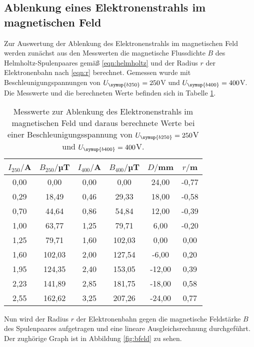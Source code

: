 \subsection{Ablenkung eines Elektronenstrahls im magnetischen Feld}
\label{subsec:bfeld}

Zur Auswertung der Ablenkung des Elektronenstrahls im magnetischen Feld werden
zunächst aus den Messwerten die magnetische Flussdichte $B$ des Helmholtz-Spulenpaares
gemäß \eqref{eqn:helmholtz} und der Radius $r$ der Elektronenbahn nach \eqref{eqn:r} berechnet.
Gemessen wurde mit Beschleunigungspannungen von $U_{\symup{b250}}=250$V und
$U_{\symup{b400}}=400$V. Die Messwerte und
die berechneten Werte befinden sich in Tabelle \ref{tab:magnetisch}.

\begin{table}[htp]
	\begin{center}
    \caption{Messwerte zur Ablenkung des Elektronenstrahls im magnetischen Feld und
    daraus berechnete Werte bei einer Beschleunigungsspannung von
    $U_{\symup{b250}}=250$V und $U_{\symup{b400}}=400$V.}
    \label{tab:magnetisch}
		\begin{tabular}{cccccc}
		\toprule
			{$I_{250}/$A} & {$B_{250}/$µT} & {$I_{400}/$A} & {$B_{400}/$µT} & {$D/$mm} & {$r/$m}\\
			\midrule
			0,00 & 0,00  & 0,00 &  0,00 & 24,00 & -0,77\\
			0,29 & 18,49 & 0,46 & 29,33 & 18,00 & -0,58\\
			0,70 & 44,64 & 0,86 & 54,84 & 12,00 & -0,39\\
			1,00 & 63,77 & 1,25 & 79,71 & 6,00 & -0,20\\
			1,25 & 79,71 & 1,60 & 102,03 & 0,00 & 0,00\\
			1,60 & 102,03 & 2,00 & 127,54 & -6,00 & 0,20\\
			1,95 & 124,35 & 2,40 & 153,05 & -12,00 & 0,39\\
			2,23 & 141,89 & 2,85 & 181,75 & -18,00 & 0,58\\
			2,55 & 162,62 & 3,25 & 207,26 & -24,00 & 0,77\\
		\bottomrule
		\end{tabular}
	\end{center}
\end{table}

Nun wird der Radius $r$ der Elektronenbahn gegen die magnetische Feldstärke $B$
des Spulenpaares aufgetragen und eine lineare Ausgleichsrechnung durchgeführt.
Der zughörige Graph ist in Abbildung \ref{fig:bfeld} zu sehen.

